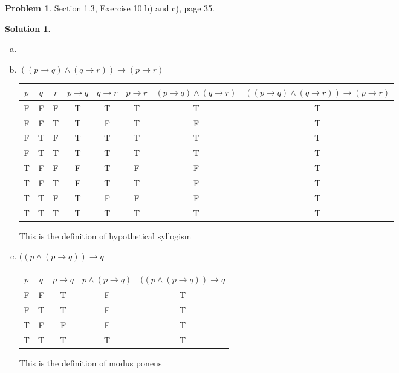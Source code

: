 \documentclass{article}
\theoremstyle{definition}
\newtheorem{problem}{Problem}
\newtheorem*{solution}{Solution}
\begin{document}
\begin{problem} Section 1.3, Exercise 10 b) and c), page 35.
\end{problem}
\begin{solution}
  \begin{enumerate}[(a)]
  \item
    \item $((p \rightarrow q) \land (q \rightarrow r)) \rightarrow (p \rightarrow r)$
    \begin{center}
      \begin{tabular}{|c c c || c c c c c|}
      \hline
        $p$ & $q$ & $r$ & $p \rightarrow q$ & $q \rightarrow r$ & $p \rightarrow r$ & $(p \rightarrow q) \land (q \rightarrow r)$ & $((p \rightarrow q) \land (q \rightarrow r)) \rightarrow (p \rightarrow r)$ \\
        \hline
        F & F & F & T & T & T & T & T \\
        F & F & T & T & F & T & F & T \\
        F & T & F & T & T & T & T & T \\
        F & T & T & T & T & T & T & T \\
        \hline
        T & F & F & F & T & F & F & T \\
        T & F & T & F & T & T & F & T \\
        T & T & F & T & F & F & F & T \\
        T & T & T & T & T & T & T & T \\
        \hline
      \end{tabular}
    \end{center}
    This is the definition of hypothetical syllogism
    
    \item $((p \land (p \rightarrow q)) \rightarrow q$
    \begin{center}
      \begin{tabular}{|c c|| c c c|}
      \hline
        $p$ & $q$ & $p \rightarrow q$ & $p \land (p \rightarrow q)$ & $((p \land (p \rightarrow q)) \rightarrow q$\\
        \hline
        F & F & T & F & T \\
        F & T & T & F & T \\
        T & F & F & F & T \\
        T & T & T & T & T \\
        \hline
      \end{tabular}
    \end{center}
    This is the definition of modus ponens    
  \end{enumerate}
\end{solution}
\end{document}
